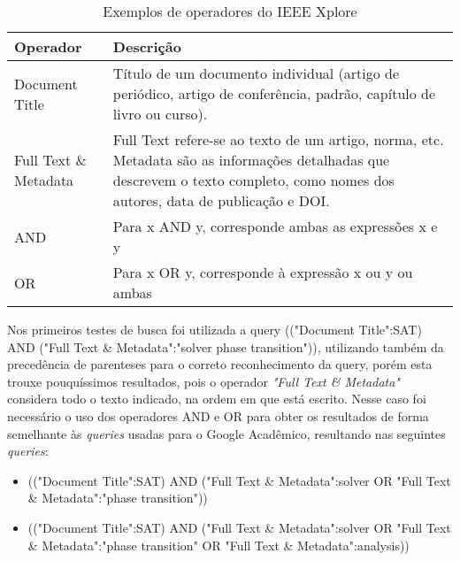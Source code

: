 \begin{table}[!htb]
\centering
\caption{Exemplos de operadores do IEEE Xplore}
    \begin{tabular}{|p{3cm}|P{10cm}|}
    \hline
    \textbf{Operador}     & \textbf{Descrição}                                                                                                                                                              \\ \hline
    Document Title        & Título de um documento individual (artigo de periódico, artigo de conferência, padrão, capítulo de livro ou curso).                                                             \\ \hline
    Full Text \& Metadata & Full Text refere-se ao texto de um artigo, norma, etc. Metadata são as informações detalhadas que descrevem o texto completo, como nomes dos autores, data de publicação e DOI. \\ \hline
    AND                   & Para x AND y, corresponde ambas as expressões x e y                                                                                                                             \\ \hline
    OR                    & Para x OR y, corresponde à expressão x ou y ou ambas                                                                                                                            \\ \hline
    \end{tabular}
\label{table:ieeexplore_opeartors}
\end{table} 


 Nos primeiros testes de busca foi utilizada a query (("Document Title":SAT) AND ("Full Text \& Metadata":"solver phase transition")), utilizando também da precedência de parenteses para o correto reconhecimento da query, porém esta trouxe pouquíssimos resultados, pois o operador \textit{"Full Text \& Metadata"} considera todo o texto indicado, na ordem em que está escrito. Nesse caso foi necessário o uso dos operadores AND e OR para obter os resultados de forma semelhante às \textit{queries} usadas para o Google Acadêmico, resultando nas seguintes \textit{queries}:

    \begin{itemize}
        \item (("Document Title":SAT) AND ("Full Text \& Metadata":solver OR "Full Text \& Metadata":"phase transition"))
        \item (("Document Title":SAT) AND ("Full Text \& Metadata":solver OR "Full Text \& Metadata":"phase transition" OR "Full Text \& Metadata":analysis))
    \end{itemize}

